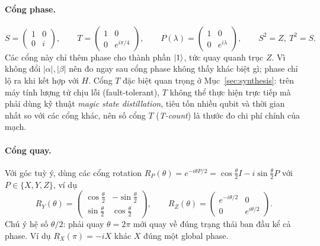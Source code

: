 \paragraph{Cổng phase.}
\begin{equation}
  S = \begin{pmatrix}1&0\\0&i\end{pmatrix}, \qquad
  T = \begin{pmatrix}1&0\\0&e^{i\pi/4}\end{pmatrix}, \qquad
  P(\lambda) = \begin{pmatrix}1&0\\0&e^{i\lambda}\end{pmatrix},
  \qquad S^2 = Z,\ T^2 = S.
\end{equation}
Các cổng này chỉ thêm phase cho thành phần $\ket{1}$, tức quay quanh trục $Z$. Vì không đổi
$|\alpha|, |\beta|$ nên đo ngay sau cổng phase không thấy khác biệt gì; phase chỉ lộ ra khi kết hợp
với $H$. Cổng $T$ đặc biệt quan trọng ở Mục~\ref{sec:synthesis}: trên máy tính lượng tử chịu lỗi
(fault-tolerant), $T$ không thể thực hiện trực tiếp mà phải dùng kỹ thuật \emph{magic state
distillation}, tiêu tốn nhiều qubit và thời gian nhất so với các cổng khác, nên số cổng $T$
(\emph{T-count}) là thước đo chi phí chính của mạch.

\paragraph{Cổng quay.} Với góc tuỳ ý, dùng các cổng rotation
$R_P(\theta) = e^{-i\theta P/2} = \cos\tfrac{\theta}{2}I - i\sin\tfrac{\theta}{2}P$ với
$P \in \{X, Y, Z\}$, ví dụ
\begin{equation}
  R_Y(\theta) = \begin{pmatrix}\cos\frac\theta2 & -\sin\frac\theta2\\[2pt]
                               \sin\frac\theta2 & \cos\frac\theta2\end{pmatrix}, \qquad
  R_Z(\theta) = \begin{pmatrix}e^{-i\theta/2}&0\\0&e^{i\theta/2}\end{pmatrix}.
\end{equation}
Chú ý hệ số $\theta/2$: phải quay $\theta = 2\pi$ mới quay về đúng trạng thái ban đầu kể cả phase.
Ví dụ $R_X(\pi) = -iX$ khác $X$ đúng một global phase.


